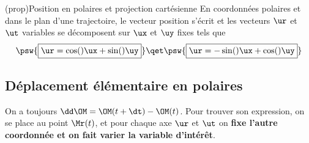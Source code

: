 \documentclass[../../main/main.tex]{subfiles}
\begin{document}
\begin{tcb*}(prop){Position en polaires et projection cartésienne}
	En coordonnées polaires et dans le plan d'une trajectoire, le vecteur
	position s'écrit
	\psw{\[\boxed{\OM = r\ur}\]}
	et les vecteurs $\ur$ et $\ut$ variables se décomposent sur $\ux$ et $\uy$
	fixes tels que
	\[
		\psw{\boxed{\ur = \cos(\tt)\ux + \sin(\tt)\uy}}
		\qet
		\psw{\boxed{\ur = -\sin(\tt)\ux + \cos(\tt)\uy}}
	\]
\end{tcb*}

\subsection{Déplacement élémentaire en polaires}
On a toujours $\dd\OM = \OM(t+\dt) - \OM(t)$. Pour trouver son expression, on se
place au point $\Mr (t)$, et pour chaque axe $\ur$ et $\ut$ on \textbf{fixe
	l'autre coordonnée et on fait varier la variable d'intérêt}.
\end{document}
